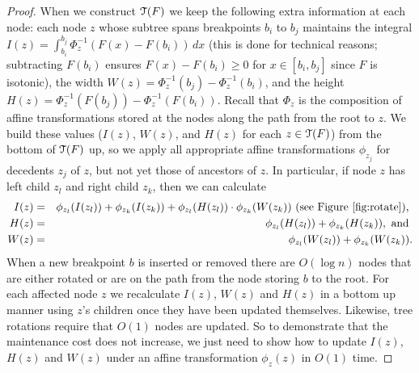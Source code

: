 \documentclass[11pt]{article}
\def\TT{\EuScript{T}}
\begin{document}
\begin{proof}
When we construct $\TT(F)$ we keep the following extra information at each node: 
each node $z$ whose subtree spans breakpoints $b_i$ to $b_j$ maintains the integral $I(z) = \int_{b_i}^{b_j} \Phi_z^{-1}(F(x)-F(b_i))\, dx$ (this is done for technical reasons; subtracting $F(b_i)$ ensures $F(x)-F(b_i) \geq 0$ for $x \in [b_i, b_j]$ since $F$ is isotonic), the width $W(z) = \Phi_z^{-1}(b_j) - \Phi_z^{-1}(b_i)$, and the height $H(z) = \Phi_z^{-1}(F(b_j)) - \Phi_z^{-1}(F(b_i))$.  
Recall that $\Phi_z$ is the composition of affine transformations stored at the nodes along the path from the root to $z$.  
We build these values ($I(z)$, $W(z)$, and $H(z)$ for each $z \in \TT(F)$) from the bottom of $\TT(F)$ up, so we apply all appropriate affine transformations $\phi_{z_j}$ for decedents $z_j$ of $z$, but not yet those of ancestors of $z$.  In particular, if node $z$ has left child $z_l$ and right child $z_k$, then we can calculate 
\begin{eqnarray*}
I(z) &=& \phi_{z_l}(I(z_l)) + \phi_{z_k}(I(z_k)) + \phi_{z_l}(H(z_l)) \cdot \phi_{z_k}(W(z_k)) \textrm{ (see Figure \ref{fig:rotate}), } 
\\
H(z) &=& \phi_{z_l}(H(z_l)) + \phi_{z_k}(H(z_k)), \textrm{ and } 
\\
W(z) &=& \phi_{z_l}(W(z_l)) + \phi_{z_k}(W(z_k)).
\end{eqnarray*}  
When a new breakpoint $b$ is inserted or removed there are $O(\log n)$ nodes that are either rotated or are on the path from the node storing $b$ to the root.  For each affected node $z$ we recalculate $I(z)$, $W(z)$ and $H(z)$ in a bottom up manner using $z$'s children once they have been updated themselves.  Likewise, tree rotations require that $O(1)$ nodes are updated.  So to demonstrate that the maintenance cost does not increase, we just need to show how to update $I(z)$, $H(z)$ and $W(z)$ under an affine transformation $\phi_z(z)$ in $O(1)$ time.  


\end{proof}
\end{document}
